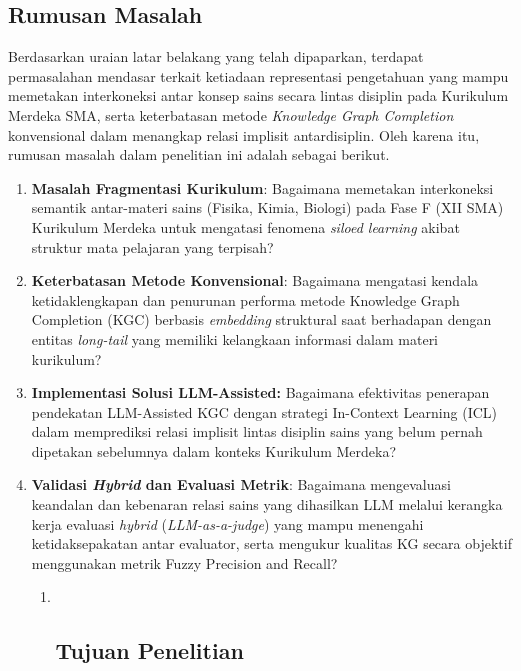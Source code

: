 \documentclass[
]{article}
\begin{document}
\hypertarget{rumusan-masalah}{%
\subsection{Rumusan Masalah}\label{rumusan-masalah}}

Berdasarkan uraian latar belakang yang telah dipaparkan, terdapat
permasalahan mendasar terkait ketiadaan representasi pengetahuan yang
mampu memetakan interkoneksi antar konsep sains secara lintas disiplin
pada Kurikulum Merdeka SMA, serta keterbatasan metode \emph{Knowledge
Graph Completion} konvensional dalam menangkap relasi implisit
antardisiplin. Oleh karena itu, rumusan masalah dalam penelitian ini
adalah sebagai berikut.

\begin{enumerate}
\def\labelenumi{\arabic{enumi}.}
\item
  \textbf{Masalah Fragmentasi Kurikulum}: Bagaimana memetakan
  interkoneksi semantik antar-materi sains (Fisika, Kimia, Biologi) pada
  Fase F (XII SMA) Kurikulum Merdeka untuk mengatasi fenomena
  \emph{siloed learning} akibat struktur mata pelajaran yang terpisah?
\item
  \textbf{Keterbatasan Metode Konvensional}: Bagaimana mengatasi kendala
  ketidaklengkapan dan penurunan performa metode Knowledge Graph
  Completion (KGC) berbasis \emph{embedding} struktural saat berhadapan
  dengan entitas \emph{long-tail} yang memiliki kelangkaan informasi
  dalam materi kurikulum?
\item
  \textbf{Implementasi Solusi LLM-Assisted:} Bagaimana efektivitas
  penerapan pendekatan LLM-Assisted KGC dengan strategi In-Context
  Learning (ICL) dalam memprediksi relasi implisit lintas disiplin sains
  yang belum pernah dipetakan sebelumnya dalam konteks Kurikulum
  Merdeka?
\item
  \textbf{Validasi \emph{Hybrid} dan Evaluasi Metrik}: Bagaimana
  mengevaluasi keandalan dan kebenaran relasi sains yang dihasilkan LLM
  melalui kerangka kerja evaluasi \emph{hybrid} (\emph{LLM-as-a-judge})
  yang mampu menengahi ketidaksepakatan antar evaluator, serta mengukur
  kualitas KG secara objektif menggunakan metrik Fuzzy Precision and
  Recall?

  \begin{enumerate}
  \def\labelenumii{\arabic{enumii}.}
  \item ~
    \hypertarget{tujuan-penelitian}{%
    \subsection{Tujuan Penelitian}\label{tujuan-penelitian}}
  \end{enumerate}
\end{enumerate}
\end{document}
